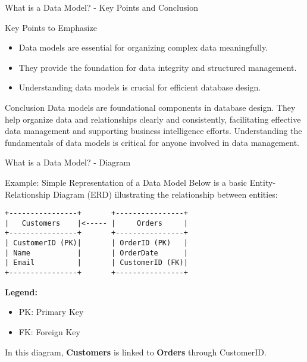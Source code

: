 \documentclass[aspectratio=169]{beamer}
\begin{document}
\begin{frame}[fragile]{What is a Data Model? - Key Points and Conclusion}
    \begin{block}{Key Points to Emphasize}
        \begin{itemize}
            \item Data models are essential for organizing complex data meaningfully.
            \item They provide the foundation for data integrity and structured management.
            \item Understanding data models is crucial for efficient database design.
        \end{itemize}
    \end{block}
    
    \begin{block}{Conclusion}
        Data models are foundational components in database design. They help organize data and relationships clearly and consistently, facilitating effective data management and supporting business intelligence efforts. Understanding the fundamentals of data models is critical for anyone involved in data management.
    \end{block}
\end{frame}

\begin{frame}[fragile]{What is a Data Model? - Diagram}
    \begin{block}{Example: Simple Representation of a Data Model}
        Below is a basic Entity-Relationship Diagram (ERD) illustrating the relationship between entities:
        
        \begin{center}
            \begin{verbatim}
+----------------+       +----------------+
|   Customers    |<----- |     Orders     |
+----------------+       +----------------+
| CustomerID (PK)|       | OrderID (PK)   |
| Name           |       | OrderDate      |
| Email          |       | CustomerID (FK)|
+----------------+       +----------------+
            \end{verbatim}
        \end{center}
        
        \textbf{Legend:} 
        \begin{itemize}
            \item PK: Primary Key
            \item FK: Foreign Key
        \end{itemize}
        
        In this diagram, \textbf{Customers} is linked to \textbf{Orders} through CustomerID.
    \end{block}
\end{frame}
\end{document}
